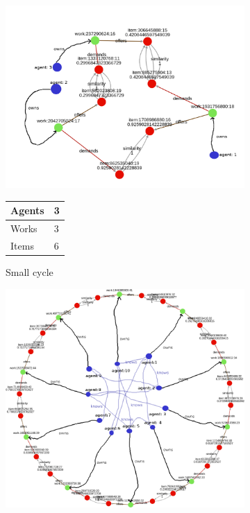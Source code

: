 \documentclass{article}
\begin{document}
\begin{figure}[H]
    \centering
    \captionsetup{justification=centering, size=scriptsize}
    \begin{subfigure}{0.45\textwidth}
      \includegraphics[width=1\textwidth]{small_cycle_with_agents.png}
      \caption{Small cycle}
      \scriptsize
      \begin{tabular}{ | L{2 cm} | L{0.5 cm} | }
      \hline
      Agents & 3  \\ \hline
      Works & 3  \\ \hline
      Items & 6  \\ \hline
      \end{tabular}
      \label{fig:cycle-small-with-agents}
    \end{subfigure}
    \quad
    \begin{subfigure}{0.38\textwidth}
      \includegraphics[width=1\textwidth]{larger_cycle_with_agents.png}

\end{subfigure}
\end{figure}
\end{document}
